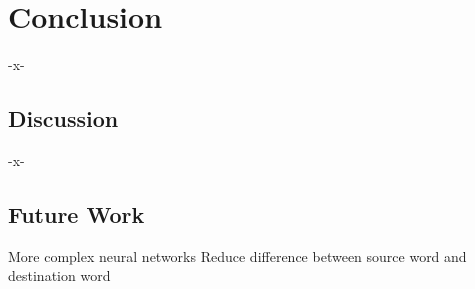 \chapter{Conclusion}
-x-
\section{Discussion}
-x-
\section{Future Work}
More complex neural networks
Reduce difference between source word and destination word
